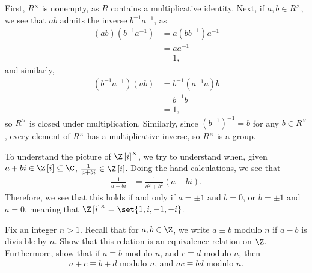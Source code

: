 \documentclass[10pt]{mypackage}
\begin{document}
\begin{solution}
  First, $R^{\times}$ is nonempty, as $R$ contains a multiplicative identity. Next, if $a,b\in R^{\times}$, we see that $ab$ admits the inverse $b^{-1}a^{-1}$, as
  \begin{align*}
    \left( ab \right)\left( b^{-1}a^{-1} \right) &= a\left( bb^{-1} \right)a^{-1}\\
                                                 &= aa^{-1}\\
                                                 &= 1,
  \end{align*}
  and similarly,
  \begin{align*}
    \left( b^{-1}a^{-1} \right)\left( ab \right) &= b^{-1}\left( a^{-1}a \right)b\\
                                                 &= b^{-1}b\\
                                                 &= 1,
  \end{align*}
  so $R^{\times}$ is closed under multiplication. Similarly, since $\left( b^{-1} \right)^{-1} = b$ for any $b\in R^{\times}$, every element of $R^{\times}$ has a multiplicative inverse, so $R^{\times}$ is a group.\newline

  To understand the picture of $\Z\left[ i \right]^{\times}$, we try to understand when, given $a+bi\in \Z\left[ i \right]\subseteq \C$, $\frac{1}{a+bi}\in \Z\left[ i \right]$. Doing the hand calculations, we see that
  \begin{align*}
    \frac{1}{a+bi} &= \frac{1}{a^2+b^2} \left( a-bi \right).
  \end{align*}
  Therefore, we see that this holds if and only if $a=\pm 1$ and $b = 0$, or $b = \pm 1$ and $a = 0$, meaning that $\Z\left[ i \right]^{\times} = \set{1,i,-1,-i}$.
\end{solution}
\begin{problem}[Problem 3]
  Fix an integer $n > 1$. Recall that for $a,b\in \Z$, we write $a \equiv b$ modulo $n$ if $a-b$ is divisible by $n$. Show that this relation is an equivalence relation on $\Z$. Furthermore, show that if $a\equiv b$ modulo $n$, and $c\equiv d$ modulo $n$, then
  \begin{align*}
    a+c \equiv b+d\text{ modulo $n$, and } ac\equiv bd\text{ modulo $n$.}
  \end{align*}
\end{problem}
\end{document}
